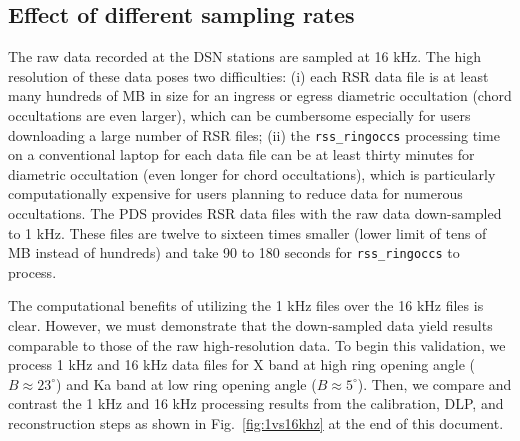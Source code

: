 \documentclass[titlepage, 12pt]{article}
\begin{document}
        \subsection{Effect of different sampling rates}
            The raw data recorded at the DSN stations are sampled
            at 16 kHz. The high resolution of these data poses two
            difficulties: (i) each RSR data file is at least many
            hundreds of MB in size for an ingress or egress
            diametric occultation (chord occultations are even larger),
            which can be cumbersome especially for users downloading a
            large number of RSR files; (ii) the \texttt{rss\_ringoccs}
            processing time on a conventional laptop for each data
            file can be at least thirty minutes for diametric
            occultation (even longer for chord occultations), which
            is particularly computationally expensive for users
            planning to reduce data for numerous occultations. The
            PDS provides RSR data files with the raw data down-sampled
            to 1 kHz. These files are twelve to sixteen times smaller
            (lower limit of tens of MB instead of hundreds)
            and take 90 to 180 seconds for \texttt{rss\_ringoccs} to process.
            \par\hfill\par
            The computational benefits of utilizing the 1 kHz files
            over the 16 kHz files is clear. However, we must demonstrate
            that the down-sampled data yield results comparable to
            those of the raw high-resolution data. To begin this
            validation, we process 1 kHz and 16 kHz data files for
            X band at high ring opening angle ($B\approx23^\circ$)
            and Ka band at low ring opening angle ($B\approx5^\circ$).
            Then, we compare and contrast the 1 kHz and 16 kHz
            processing results from the calibration, DLP, and
            reconstruction steps as shown in Fig.~\ref{fig:1vs16khz} at the end of this 
            document.
            \par\hfill\par
\end{document}

